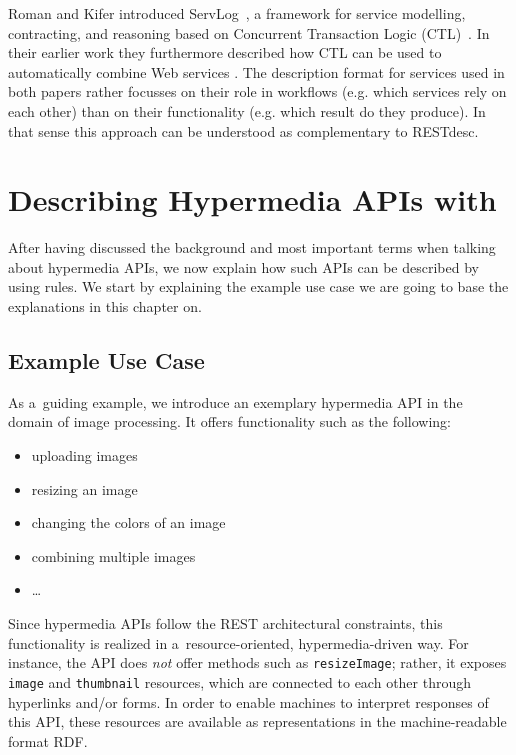 % 
% 
% 
% 
% 
% 
% 
% 
% 
% 
Roman and Kifer introduced ServLog~\cite{servlog}, a framework for service modelling, contracting, and reasoning based on Concurrent Transaction Logic (CTL)~\cite{ctl}. 
In their earlier work they furthermore described how CTL can be used to automatically combine Web services  \cite{roman}.
The description format for services used in both papers rather focusses on their role in workflows (e.g. which services rely on each other) than on their functionality (e.g.
which result do they produce). 
In that sense this approach can be understood as complementary to RESTdesc. 








\section{Describing Hypermedia APIs with \restdesc}
\label{sec:RESTdesc}
After having discussed the background and most important terms when talking about hypermedia APIs, we now explain how such APIs can be described by using \nthree rules. We start by explaining the example 
use case we are going to base the explanations in this chapter on.

\subsection{Example Use Case}\label{usecase}
As a~guiding example, we introduce an exemplary hypermedia API
in the domain of image processing.
It offers functionality such as the following:
\begin{itemize}
  \item uploading images
  \item resizing an image
  \item changing the colors of an image
  \item combining multiple images
  \item \ldots
\end{itemize}
Since hypermedia APIs follow the REST architectural constraints,
this functionality is realized in a~resource-oriented, hypermedia-driven way.
For instance, the API does \emph{not} offer methods such as \verb!resizeImage!;
rather, it exposes \verb!image! and \verb!thumbnail! resources,
which are connected to each other through hyperlinks and/or forms.
In order to enable machines to interpret responses of this API,
these resources are available as representations in the machine-readable format RDF.

